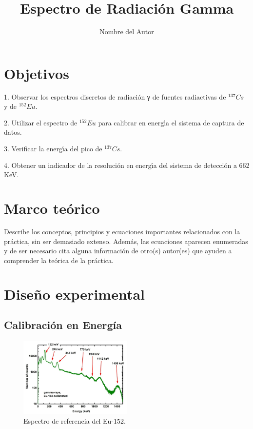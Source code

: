 \documentclass[twocolumn,a4paper,11pt]{scrartcl}
\title{Espectro de Radiación Gamma}
\author{Nombre del Autor}
\date{}
\begin{document}

\section{Objetivos}
1. Observar los espectros discretos de radiación γ de fuentes radiactivas de $^{137}Cs$ y de $^{152}Eu$.

2. Utilizar el espectro de $^{152}Eu$ para calibrar en energı́a el sistema de captura de datos.

3. Verificar la energı́a del pico de $^{137}Cs$.

4. Obtener un indicador de la resolución en energı́a del sistema de detección a 662 KeV.

\section{Marco teórico}
Describe los conceptos, principios y ecuaciones importantes relacionados con la práctica, sin ser demasiado extenso. Además, las ecuaciones aparecen enumeradas y de ser necesario cita alguna información de otro(s) autor(es) que ayuden a comprender la teórica de la práctica.

\section{Diseño experimental}
\subsection*{Calibración en Energía}

\begin{figure}[]
  \includegraphics[width=0.50\textwidth]{espectro_de_referencia.png}
  \caption{Espectro de referencia del Eu-152.}
  \label{fig:eu152_ref}
\end{figure}
\end{document}
